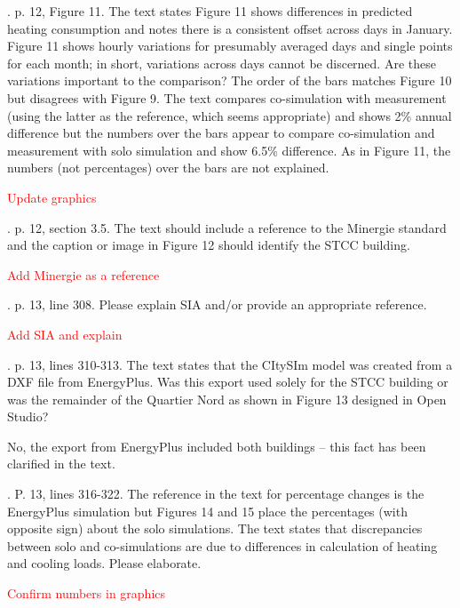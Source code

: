 \documentclass[answers,12pt]{exam}
\begin{document}
\begin{questions}
. p. 12, Figure 11.  The text states Figure 11 shows differences in predicted heating consumption and notes there is a consistent offset across days in January.  Figure 11 shows hourly variations for presumably averaged days and single points for each month; in short, variations across days cannot be discerned.  Are these variations important to the comparison?  The order of the bars matches Figure 10 but disagrees with Figure 9.  The text compares co-simulation with measurement (using the latter as the reference, which seems appropriate) and shows 2\% annual difference but the numbers over the bars appear to compare co-simulation and measurement with solo simulation and show 6.5\% difference.  As in Figure 11, the numbers (not percentages) over the bars are not explained. 
\begin{solution}
\textcolor{red}{Update graphics}
\end{solution}

. p. 12, section 3.5.  The text should include a reference to the Minergie standard and the caption or image in Figure 12 should identify the STCC building. 
\begin{solution}
\textcolor{red}{Add Minergie as a reference}
\end{solution}

. p. 13, line 308.  Please explain SIA and/or provide an appropriate reference.   
\begin{solution}
\textcolor{red}{Add SIA and explain}
\end{solution}

. p. 13, lines 310-313.  The text states that the CItySIm model was created from a DXF file from EnergyPlus.  Was this export used solely for the STCC building or was the remainder of the Quartier Nord as shown in Figure 13 designed in Open Studio? 
\begin{solution}
No, the export from EnergyPlus included both buildings -- this fact has been clarified in the text.

\end{solution}

. P. 13, lines 316-322.  The reference in the text for percentage changes is the EnergyPlus simulation but Figures 14 and 15 place the percentages (with opposite sign) about the solo simulations.  The text states that discrepancies between solo and co-simulations are due to differences in calculation of heating and cooling loads.  Please elaborate. 
\begin{solution}
\textcolor{red}{Confirm numbers in graphics}
\end{solution}


\end{questions}
\end{document}
